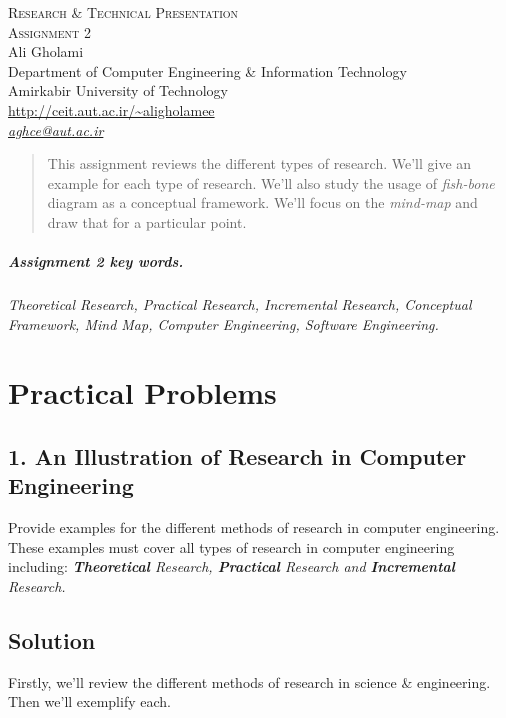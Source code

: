 \documentclass[12pt]{article}
\numberwithin{equation}{section}
\numberwithin{table}{section}
\numberwithin{figure}{section}
\begin{document}

\begin{center}
\textsc{\Large Research \& Technical Presentation} \\[2pt]
	\textsc{\large Assignment 2}\\
	\vspace{0.5cm}
  Ali Gholami \\[6pt]
  Department of Computer Engineering \& Information Technology\\
  Amirkabir University of Technology  \\[6pt]
  \def\UrlFont{\em}
  \url{http://ceit.aut.ac.ir/~aligholamee}\\
    \href{mailto:aghce@aut.ac.ir}{\textit{aghce@aut.ac.ir}}
\end{center}

\begin{abstract}
This assignment reviews the different types of research. We'll give an example for each type of research. We'll also study the usage of \textit{fish-bone} diagram as a conceptual framework. We'll focus on the \textit{mind-map} and draw that for a particular point.
\end{abstract}

\subparagraph{Assignment 2 key words.} \textit{Theoretical Research, Practical Research, Incremental Research, Conceptual Framework, Mind Map, Computer Engineering, Software Engineering.}
\section{Practical Problems}
\subsection{1. An Illustration of Research in Computer Engineering}

Provide examples for the different methods of research in computer engineering. These examples must cover all types of research in computer engineering including:
\textit{\textbf{Theoretical} Research, \textbf{Practical} Research and \textbf{Incremental} Research.} 

\subsection{Solution}

Firstly, we'll review the different methods of research in science \& engineering. Then we'll exemplify each. 
\end{document}
